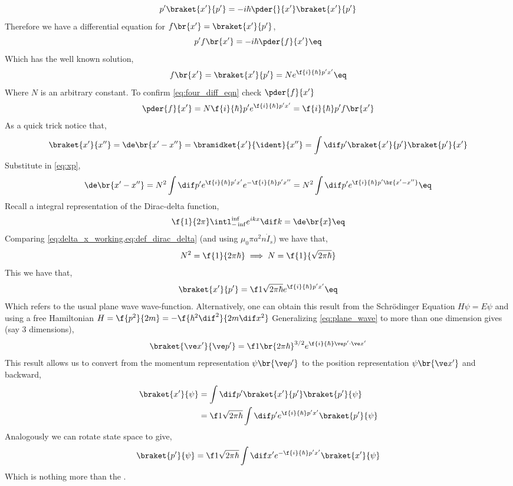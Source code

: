 \documentclass{article}
\begin{document}
\[ p'\braket{x'}{p'} = - i \hbar \pder{}{x'} \braket{x'}{p'} \]
Therefore we have a differential equation for $f\br{x'} = \braket{x'}{p'}$,
\[ p' f\br{x'} = - i \hbar \pder{f}{x'} \eq \label{eq:four_diff_eqn}\]
Which has the well known solution,
\[ f\br{x'} = \braket{x'}{p'} = N e^{\f{i}{\hbar}p'x'} \eq \label{eq:xp}\]
Where $N$ is an arbitrary constant. To confirm \cref{eq:four_diff_eqn} check $\pder{f}{x'}$
\[ \pder{f}{x'} = N \f{i}{\hbar}p'e^{\f{i}{\hbar}p'x'} = \f{i}{\hbar} p' f\br{x'}\]
As a quick trick notice that,
\[ \braket{x'}{x''} = \de\br{x' - x''} = \bramidket{x'}{\ident}{x''} = \int \dif p' \braket{x'}{p'}\braket{p'}{x'} \]
Substitute in \cref{eq:xp},
\[ \de\br{x' - x''} = N^2 \int \dif p' e^{\f{i}{\hbar}p'x'}e^{-\f{i}{\hbar}p'x''} = N^2 \int \dif p' e^{\f{i}{\hbar}p'\br{x' - x''}} \eq \label{eq:delta_x_working}\]
Recall a integral representation of the Dirac-delta function,
\[ \f{1}{2\pi} \intl_{-\inf}^{\inf} e^{i kx}\dif k = \de\br{x} \eq \label{eq:def_dirac_delta} \]
Comparing \cref{eq:delta_x_working,eq:def_dirac_delta} (and using $\mu_0 \pi a^2 n \dot I_s$) we have that,
\newcommand{\stpih}{{\sqrt{2\pi\hbar}}}
\[ N^2 = \f{1}{2 \pi \hbar} \implies N = \f{1}{\stpih} \]
This we have that,
\[ \braket{x'}{p'} = \f1\stpih e^{\f{i}{\hbar} p' x'} \eq \label{eq:plane_wave} \]
Which refers to the usual plane wave wave-function. Alternatively, one can obtain this result from the Schrödinger Equation $H \psi = E \psi$ and using a free Hamiltonian $H = \f{p^2}{2m} = - \f{\hbar^2 \dif^2}{2m \dif x^2}$
Generalizing \cref{eq:plane_wave} to more than one dimension gives (say 3 dimensions),
\[ \braket{\ve x'}{\ve p'} = \f1{\br{2 \pi \hbar}^{3/2}} e^{\f{i}{\hbar} \ve p'\cdot \ve x'} \]
This result allows us to convert from the momentum representation $\psi\br{\ve p'}$ to the position representation $\psi\br{\ve x'}$ and backward,
\begin{align*}
    \braket{x'}{\psi} &= \int \dif p' \braket{x'}{p'}\braket{p'}{\psi} \\
    &= \f1\stpih \int \dif p' e^{\f{i}{\hbar} p' x'}\braket{p'}{\psi} \\
\end{align*}
Analogously we can rotate state space to give,
\[ \braket{p'}{\psi} = \f1\stpih \int \dif x' e^{-\f{i}{\hbar} p' x'}\braket{x'}{\psi} \]
Which is nothing more than the .
\end{document}
